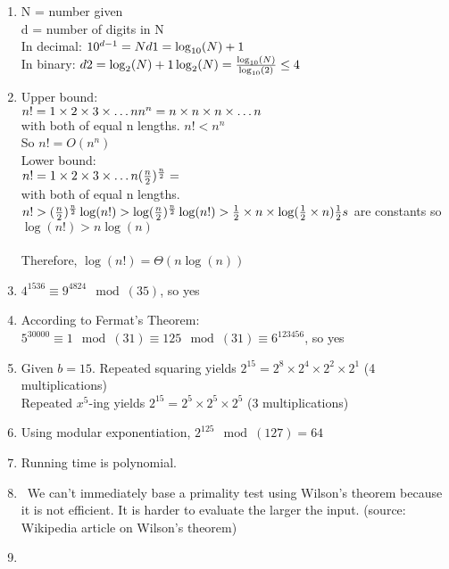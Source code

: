 \documentclass{article}
\begin{document}
\begin{enumerate}
	\item
		N = number given \\
		d = number of digits in N \\
		In decimal: $10^{d - 1} = N \\
		d1 = \log_{10}(N) + 1$\\
		In binary: $d2 = \log_{2}(N) + 1\\
		\log_{2}(N) = \frac{\log_{10}(N)}{\log_{10}(2)} \leq 4$
	
	\item
		Upper bound: \\
		$n! = 1 \times 2 \times 3 \times \dots n \\
		n^{n} = n \times n \times n \times \dots n $\\
		with both of equal n lengths. $n! < n^{n}$ \\
		So $n! = O(n^{n})$ \\
		Lower bound: \\
		$n! = 1 \times 2 \times 3 \times \dots n \\
		(\frac{n}{2})^{\frac{n}{2}} = $ \\
		with both of equal n lengths. $n! > (\frac{n}{2})^{\frac{n}{2}} \\
		\log(n!) > \log(\frac{n}{2})^{\frac{n}{2}} \\
		\log(n!) > \frac{1}{2} \times n \times \log(\frac{1}{2} \times n) \\
		\frac{1}{2}s$ are constants so \\
		$\log(n!) > n\log(n)$ \\ \\
		Therefore, $\log(n!) = \Theta(n\log(n))$
		
	\item
		$4^{1536} \equiv 9^{4824}\mod(35)$, so yes
		
	\item
		According to Fermat's Theorem: \\
		$5^{30000}\equiv 1 \mod(31) \equiv 125 \mod(31) \equiv 6^{123456}$, so yes
		
	\item
		Given $b = 15$. Repeated squaring yields $2^{15} = 2^{8} \times 2^{4} \times 2^{2} \times 2^{1}$ (4 multiplications)\\
		Repeated $x^{5}$-ing yields $2^{15} = 2^{5} \times 2^{5} \times 2^{5}$ (3 multiplications)
		
	\item
		Using modular exponentiation, $2^{125}\mod(127) = 64$
		
	\item
		
		Running time is polynomial.
		
	\item
		\ We can't immediately base a primality test using Wilson's theorem because it is not efficient. It is harder to evaluate the larger the input. (source: Wikipedia article on Wilson's theorem)
		
	\item
		
	

\end{enumerate}
\end{document}
